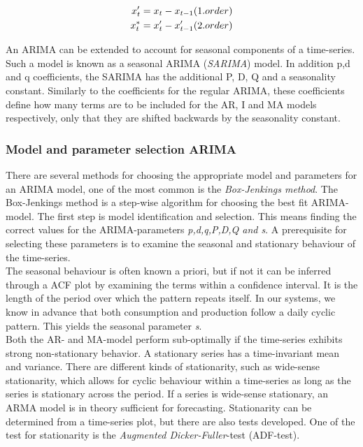 \begin{align}
    x_t' &= x_t - x_{t-1}        (1.order)\notag\\
    x_t^* &= x_t' - x_{t-1}'     (2.order)
    \label{eq:differencing}
\end{align}

An ARIMA can be extended to account for seasonal components of a time-series. Such a model is known as a seasonal ARIMA (\textit{SARIMA}) model. In addition p,d and q coefficients, the SARIMA has the additional P, D, Q and a seasonality constant. Similarly to the coefficients for the regular  ARIMA, these coefficients define how many terms are to be included for the AR, I and MA models respectively, only that they are shifted backwards by the seasonality constant. 

\subsubsection{Model and parameter selection ARIMA}\label{seq:tuning_arima}
There are several methods for choosing the appropriate model and parameters for an ARIMA model, one of the most common is the \textit{Box-Jenkings method}. The Box-Jenkings method is a step-wise algorithm for choosing the best fit ARIMA-model. The first step is model identification and selection. This means finding the correct values for the ARIMA-parameters \textit{p,d,q,P,D,Q and s}. A prerequisite for selecting these parameters is to examine the seasonal and stationary behaviour of the time-series.\\ 

The seasonal behaviour is often known a priori, but if not it can be inferred through a ACF plot by examining the terms within a confidence interval. It is the length of the period over which the pattern repeats itself. In our systems, we know in advance that both consumption and production follow a daily cyclic pattern. This yields the seasonal parameter \textit{s}.\\

Both the AR- and MA-model perform sub-optimally if the time-series exhibits strong non-stationary behavior. A stationary series has a time-invariant mean and variance. There are different kinds of stationarity, such as wide-sense stationarity, which allows for cyclic behaviour within a time-series as long as the series is stationary across the period. If a series is wide-sense stationary, an ARMA model is in theory sufficient for forecasting. Stationarity can be determined from a time-series plot, but there are also tests developed. One of the test for stationarity is the \textit{Augmented Dicker-Fuller}-test (ADF-test).\\

